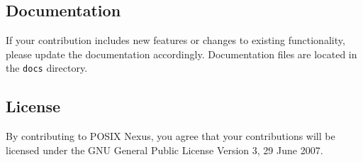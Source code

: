 \subsection{Documentation}
If your contribution includes new features or changes to existing functionality, please update the documentation accordingly. Documentation files are located in the \texttt{docs} directory.

\subsection{License}
By contributing to POSIX Nexus, you agree that your contributions will be licensed under the GNU General Public License Version 3, 29 June 2007.
\newpage
